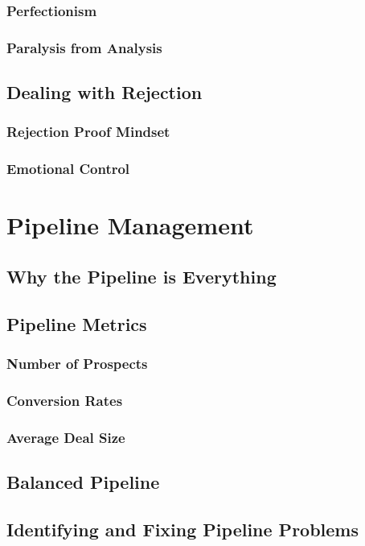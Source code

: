         \subsubsection{Perfectionism}\mbox{}
        \subsubsection{Paralysis from Analysis}\mbox{}
    \subsection{Dealing with Rejection}\mbox{}
        \subsubsection{Rejection Proof Mindset}\mbox{}
        \subsubsection{Emotional Control}\mbox{}

\section{Pipeline Management}\mbox{}
    \subsection{Why the Pipeline is Everything}\mbox{}
    \subsection{Pipeline Metrics}\mbox{}
        \subsubsection{Number of Prospects}\mbox{}
        \subsubsection{Conversion Rates}\mbox{}
        \subsubsection{Average Deal Size}\mbox{}
    \subsection{Balanced Pipeline}\mbox{}
    \subsection{Identifying and Fixing Pipeline Problems}\mbox{}

